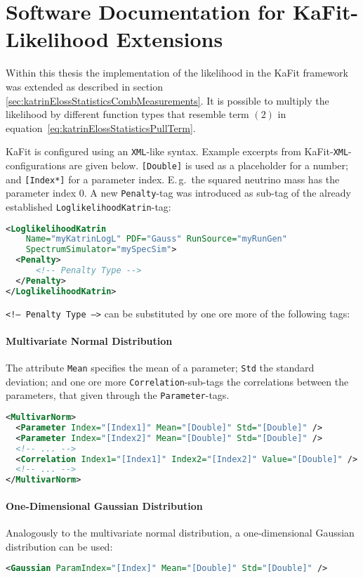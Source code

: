 \section{Software Documentation for KaFit-Likelihood Extensions}
\label{sec:appendixKatrinElossStatisticsLikelihoodExtKaFitConfig}
Within this thesis the implementation of the likelihood in the KaFit framework was extended as described in section \ref{sec:katrinElossStatisticsCombMeasurements}. It is possible to multiply the likelihood by different function types that resemble term $(2)$ in equation~\eqref{eq:katrinElossStatisticsPullTerm}. 

KaFit is configured using an \texttt{XML}-like syntax. Example excerpts from KaFit-\texttt{XML}-configurations are given below. {\color{brown}\texttt{[Double]}} is used as a placeholder for a number; and {\color{brown}\texttt{[Index*]}} for a parameter index. E.\,g.~the squared neutrino mass has the parameter index 0. A new \texttt{Penalty}-tag was introduced as sub-tag of the already established \texttt{LoglikelihoodKatrin}-tag:
\begin{lstlisting}[language=XML]
<LoglikelihoodKatrin 
    Name="myKatrinLogL" PDF="Gauss" RunSource="myRunGen" 
    SpectrumSimulator="mySpecSim">
  <Penalty>
      <!-- Penalty Type -->
  </Penalty>
</LoglikelihoodKatrin>
\end{lstlisting}
{\color{gray}\texttt{<!-- Penalty Type -->}} can be substituted by one ore more of the following tags:
\paragraph{Multivariate Normal Distribution}
The attribute {\color{magenta}\texttt{Mean}} specifies the mean of a parameter; {\color{magenta}\texttt{Std}} the standard deviation; and one ore more {\color{violet}\texttt{Correlation}}-sub-tags the correlations between the parameters, that given through the {\color{violet}\texttt{Parameter}}-tags.
\begin{lstlisting}[language=XML]
<MultivarNorm>
  <Parameter Index="[Index1]" Mean="[Double]" Std="[Double]" />
  <Parameter Index="[Index2]" Mean="[Double]" Std="[Double]" />
  <!-- ... -->
  <Correlation Index1="[Index1]" Index2="[Index2]" Value="[Double]" />
  <!-- ... -->
</MultivarNorm>
\end{lstlisting}

\paragraph{One-Dimensional Gaussian Distribution}
Analogously to the multivariate normal distribution, a one-dimensional Gaussian distribution can be used:
\begin{lstlisting}[language=XML]
<Gaussian ParamIndex="[Index]" Mean="[Double]" Std="[Double]" />
\end{lstlisting}

